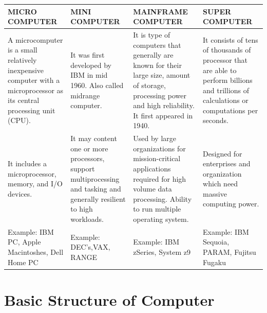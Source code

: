 \documentclass[british]{extreport}
\providecommand{\tabularnewline}{\\}
\begin{document}
\medskip{}

\begin{center}
	\begin{tabular}{|>{\raggedright}m{40mm}|>{\raggedright}m{40mm}|>{\raggedright}m{40mm}|>{\raggedright}m{40mm}|}
		\hline
		\textbf{MICRO COMPUTER}                                & \textbf{MINI COMPUTER}                                                    & \textbf{MAINFRAME COMPUTER}                                            & \textbf{SUPER COMPUTER}\tabularnewline
		\hline
		\hline
		A microcomputer is a small relatively inexpensive computer with a
		microprocessor as its central processing unit (CPU).   & It was first developed by IBM in mid 1960. Also called midrange computer. & It is type of computers that generally are known for their large size,
		amount of storage, processing power and high reliability. It first
		appeared in 1940.                                      & It consists of tens of thousands of processor that are able to perform
		billions and trillions of calculations or computations per seconds.\tabularnewline
		\hline
		It includes a microprocessor, memory, and I/O devices. & It may content one or more processors, support multiprocessing and
		tasking and generally resilient to high workloads.     & Used by large organizations for mission-critical applications required
		for high volume data processing. Ability to run multiple operating
		system.                                                & Designed for enterprises and organization which need massive computing
		power.\tabularnewline
		\hline
		Example: IBM PC, Apple Macintoshes, Dell Home PC       & Example: DEC\textquoteright s,VAX, RANGE                                  & Example: IBM zSeries, System z9                                        & Example: IBM Sequoia, PARAM, Fujitsu Fugaku\tabularnewline
		\hline
	\end{tabular}
	\par\end{center}

\chapter{Basic Structure of Computer}
\end{document}
